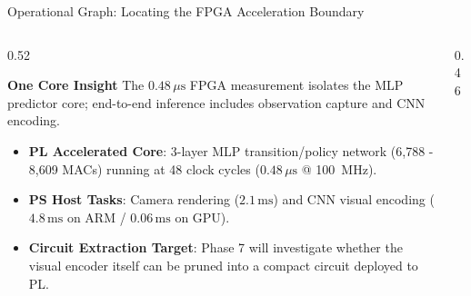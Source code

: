 \documentclass[aspectratio=169, 10pt]{beamer}
\begin{document}
\begin{frame}{Operational Graph: Locating the FPGA Acceleration Boundary}
  \begin{columns}
    \begin{column}{0.52\textwidth}
      \begin{block}{\textbf{One Core Insight}}
        The $0.48\,\mu\text{s}$ FPGA measurement isolates the MLP predictor core; end-to-end inference includes observation capture and CNN encoding.
      \end{block}
      \vspace{0.3em}
      \begin{itemize}
        \footnotesize
        \item \textbf{PL Accelerated Core}: 3-layer MLP transition/policy network (6,788 - 8,609 MACs) running at 48 clock cycles ($0.48\,\mu\text{s}$ @ 100~MHz).
        \item \textbf{PS Host Tasks}: Camera rendering ($2.1\,\text{ms}$) and CNN visual encoding ($4.8\,\text{ms}$ on ARM / $0.06\,\text{ms}$ on GPU).
        \item \textbf{Circuit Extraction Target}: Phase 7 will investigate whether the visual encoder itself can be pruned into a compact circuit deployed to PL.
      \end{itemize}
    \end{column}
    \begin{column}{0.46\textwidth}
      \centering
    \end{column}
  \end{columns}
\end{frame}
\end{document}
